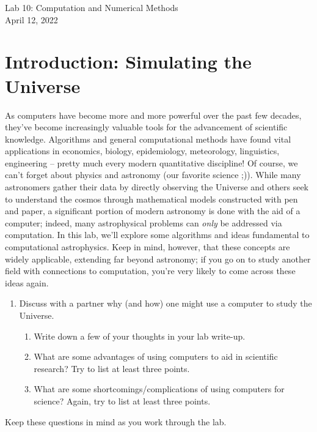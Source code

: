\documentclass[11pt]{article}
\begin{document}
\begin{center}
\huge{Lab 10: Computation and Numerical Methods}\\ \medskip \Large{April 12, 2022}
\end{center}

\section{Introduction: Simulating the Universe}
As computers have become more and more powerful over the past few decades, they've become increasingly valuable tools for the advancement of scientific knowledge. Algorithms and general computational methods have found vital applications in economics, biology, epidemiology, meteorology, linguistics, engineering -- pretty much every modern quantitative discipline! Of course, we can't forget about physics and astronomy (our favorite science ;)). While many astronomers gather their data by directly observing the Universe and others seek to understand the cosmos through mathematical models constructed with pen and paper, a significant portion of modern astronomy is done with the aid of a computer; indeed, many astrophysical problems can \textit{only} be addressed via computation. In this lab, we'll explore some algorithms and ideas fundamental to computational astrophysics. Keep in mind, however, that these concepts are widely applicable, extending far beyond astronomy; if you go on to study another field with connections to computation, you're very likely to come across these ideas again.

\begin{enumerate}
    \item Discuss with a partner why (and how) one might use a computer to study the Universe. 
    \begin{enumerate}
        \item Write down a few of your thoughts in your lab write-up.
        \item What are some advantages of using computers to aid in scientific research? Try to list at least three points.
        
        \item What are some shortcomings/complications of using computers for science? Again, try to list at least three points.
    \end{enumerate} 
\end{enumerate}
\noindent
Keep these questions in mind as you work through the lab.
\end{document}
